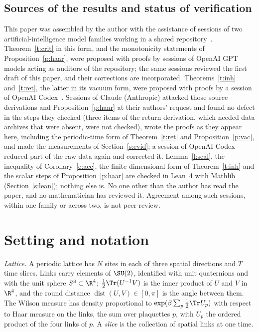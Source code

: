 \subsection{Sources of the results and status of verification}\label{s:disc}
This paper was assembled by the author with the assistance of sessions of two artificial-intelligence model
families working in a shared repository~\cite{Repo}. Theorem~\ref{t:crit} in this form, and the monotonicity
statements of Proposition~\ref{p:haar}, were proposed with proofs by sessions of OpenAI GPT models acting as
auditors of the repository; the same sessions reviewed the first draft of this paper, and their corrections
are incorporated. Theorems~\ref{t:inh} and~\ref{t:ret}, the latter in its vacuum form, were proposed with
proofs by a session of OpenAI Codex~\cite{RepoRet,RepoInh}. Sessions of Claude (Anthropic) attacked those
source derivations and Proposition~\ref{p:haar} at their authors' request and found no defect in the steps
they checked (three items of the return derivation, which needed data archives that were absent, were not
checked), wrote the
proofs as they appear here, including the periodic-time form of Theorem~\ref{t:ret} and
Proposition~\ref{p:vac}, and made the measurements of Section~\ref{s:evid}; a session of OpenAI Codex reduced
part of the raw data again and corrected it. Lemma~\ref{l:scal}, the inequality of Corollary~\ref{c:acc}, the
finite-dimensional form of Theorem~\ref{t:inh} and the scalar steps of Proposition~\ref{p:haar} are checked
in Lean~4 with Mathlib (Section~\ref{s:lean}); nothing else is. No one other than the author has read the paper, and no mathematician has reviewed it. Agreement
among such sessions, within one family or across two, is not peer review.

\section{Setting and notation}\label{s:set}
\emph{Lattice.} A periodic lattice has $N$ sites in each of three spatial directions and $T$ time slices.
Links carry elements of $\SU(2)$, identified with unit quaternions and with the unit sphere $S^3\subset\R^4$;
$\tfrac12\Tr(U^{-1}V)$ is the inner product of $U$ and $V$ in $\R^4$, and the round distance
$\operatorname{dist}(U,V)\in[0,\pi]$ is the angle between them. The Wilson measure has density proportional
to $\exp(\beta\sum_p\tfrac12\Tr U_p)$ with respect to Haar measure on the links, the sum over plaquettes $p$,
with $U_p$ the ordered product of the four links of $p$. A \emph{slice} is the collection of spatial links at
one time.

